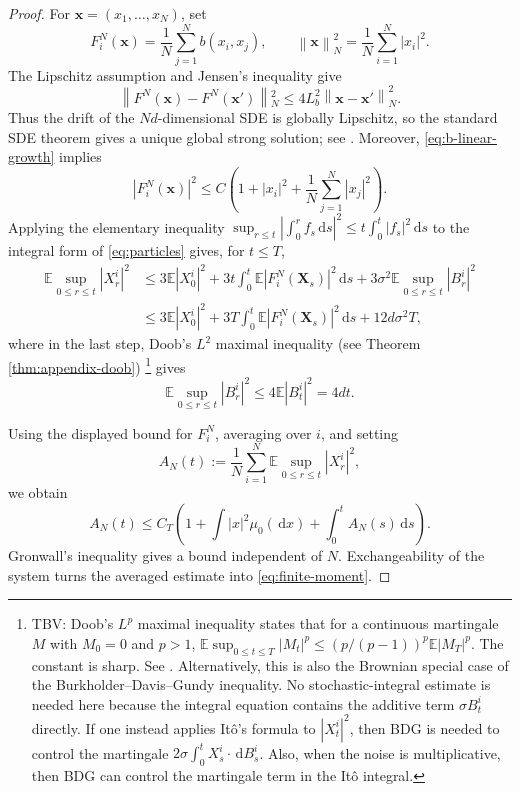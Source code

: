 \documentclass[11pt]{amsart}
\numberwithin{equation}{section}
\theoremstyle{plain}
\newcommand{\E}{\mathbb{E}}
\newcommand{\dd}{\,\mathrm{d}}
\newcommand{\abs}[1]{\left\lvert#1\right\rvert}
\newcommand{\norm}[1]{\left\lVert#1\right\rVert}
\begin{document}
\begin{proof}
For $\boldsymbol{x}=(x_1,\ldots,x_N)$, set
\[
 F_i^N(\boldsymbol{x})=\frac1N\sum_{j=1}^N b(x_i,x_j),
 \qquad
 \norm{\boldsymbol{x}}_N^2=\frac1N\sum_{i=1}^N\abs{x_i}^2.
\]
The Lipschitz assumption and Jensen's inequality give
\[
 \norm{F^N(\boldsymbol{x})-F^N(\boldsymbol{x}')}{}_N^2
 \leq 4L_b^2\norm{\boldsymbol{x}-\boldsymbol{x}'}_N^2.
\]
Thus the drift of the $Nd$-dimensional SDE is globally Lipschitz, so the
standard SDE theorem gives a unique global strong solution; see
\cite[Chapter~5]{KaratzasShreve1991}.  Moreover,
\eqref{eq:b-linear-growth} implies
\[
 \abs{F_i^N(\boldsymbol{x})}^2
 \leq C\left(1+\abs{x_i}^2+\frac1N\sum_{j=1}^N\abs{x_j}^2\right).
\]
Applying the elementary inequality
$\sup_{r\leq t}\abs{\int_0^r f_s\dd s}^2
\leq t\int_0^t\abs{f_s}^2\dd s$ to the integral form of
\eqref{eq:particles} gives, for $t\leq T$,
\begin{align*}
 \E\sup_{0\leq r\leq t}\abs{X_r^i}^2
 &\leq 3\E\abs{X_0^i}^2
 +3t\int_0^t\E\abs{F_i^N(\boldsymbol X_s)}^2\dd s
 +3\sigma^2\E\sup_{0\leq r\leq t}\abs{B_r^i}^2\\
 &\leq 3\E\abs{X_0^i}^2
 +3T\int_0^t\E\abs{F_i^N(\boldsymbol X_s)}^2\dd s
 +12d\sigma^2T, 
\end{align*}
where in the last step, Doob's $L^2$ maximal inequality (see Theorem \ref{thm:appendix-doob})
\footnote{TBV: Doob's $L^p$ maximal inequality states that for a continuous martingale $M$ with $M_0=0$ and $p>1$, $\E\sup_{0\leq t\leq T}\abs{M_t}^p\leq (p/(p-1))^p\E\abs{M_T}^p$.  The constant is sharp.  See \cite[Theorem~3.2]{KaratzasShreve1991}. Alternatively,  this is also the Brownian special case of the Burkholder--Davis--Gundy
inequality.  No stochastic-integral estimate is needed here because the
integral equation contains the additive term $\sigma B_t^i$ directly.  If one instead applies It\^o's formula to $\abs{X_t^i}^2$, then BDG is needed to control the martingale $2\sigma\int_0^t X_s^i\cdot\dd B_s^i$. Also, when the noise is multiplicative, then BDG can control the martingale term in the It\^o integral. }
gives
\[
 \E\sup_{0\leq r\leq t}\abs{B_r^i}^2
 \leq 4\E\abs{B_t^i}^2=4dt.
\] 

Using the displayed bound for $F_i^N$, averaging over $i$, and setting
\[
 A_N(t):=\frac1N\sum_{i=1}^N
 \E\sup_{0\leq r\leq t}\abs{X_r^i}^2,
\]
we obtain
\[
 A_N(t)
 \leq C_T\left(1+\int\abs{x}^2\mu_0(\dd x)
 +\int_0^t A_N(s)\dd s\right).
\]
Gronwall's inequality gives a bound independent of $N$.  Exchangeability of
the system turns the averaged estimate into \eqref{eq:finite-moment}.
\end{proof}
\end{document}
